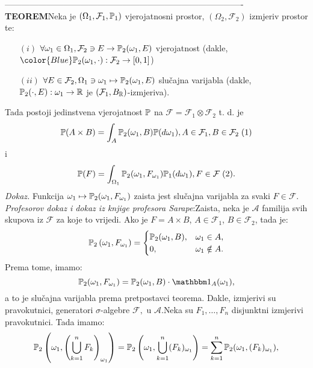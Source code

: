 \documentclass{article}
\begin{document}
-------------------------------------------------------------------------------------\newline\newline 
\textbf{TEOREM}\newline  Neka je \((\Omega_1,\mathcal F_1,\Bbb P_1)\) vjerojatnosni prostor, \((\Omega_2,\mathcal F_2)\) izmjeriv prostor te:
\begin{itemize}
    \item[\((i)\)] \(\forall\omega_1\in\Omega_1,\mathcal F_2\ni E\to\Bbb P_2(\omega_1,E)\) vjerojatnost (dakle, \(\color{Blue}\Bbb P_2(\omega_1,\cdot):\mathcal F_2\to[0,1]\))
    \item[\((ii)\)] \(\forall E\in\mathcal F_2,\Omega_1\ni\omega_1\mapsto\Bbb P_2(\omega_1,E)\) slučajna varijabla (dakle, \(\Bbb P_2(\cdot, E):\omega_1\to\Bbb R\) je \((\mathcal F_1,B_\Bbb R)\)-izmjeriva).
\end{itemize}
Tada postoji jedinstvena vjerojatnost \(\Bbb P\) na \(\mathcal F=\mathcal F_1\otimes\mathcal F_2\) t. d. je \[\Bbb P(A\times B)=\int_A\Bbb P_2(\omega_1,B)\Bbb P(d\omega_1), A\in\mathcal F_1,B\in\mathcal F_2\;(1)\] i 
\[\Bbb P(F)=\int_{\Omega_1}\Bbb P_2(\omega_1,F_{\omega_1})\Bbb P_1(d\omega_1), F\in\mathcal F\;(2).\]
\textit{Dokaz.}\newline
Funkcija \(\omega_1\mapsto\Bbb P_2(\omega_1,F_{\omega_1})\) zaista jest slučajna varijabla za svaki \(F\in\mathcal F.\)\newline\newline
\textit{Profesorov dokaz i dokaz iz knjige profesora Sarape}:\newline\newline Zaista, neka je \(\mathcal A\) familija svih skupova iz \(\mathcal F\) za koje to vrijedi. Ako je \(F = A \times B\), \(A \in \mathcal F _1\), \(B \in \mathcal F_2\), tada je:
\[\Bbb P_2\left(\omega_1, F_{\omega_1}\right)=\begin{cases} 
\Bbb P_2(\omega_1,B), &\omega_1\in A,\\0,&\omega_1\notin A.
\end{cases}\] Prema tome, imamo:\[\Bbb P_2(\omega_1, F_{\omega_1}) =\Bbb P_2(\omega_1,B)\cdot\mathbbm 1_A(\omega_1),\]
a to je slučajna varijabla prema pretpostavci teorema. Dakle, izmjerivi su pravokutnici, generatori \(\sigma\)-algebre \(\mathcal F,\) u \(\mathcal A.\)\newline Neka su \(F_1,\ldots, F_n\) disjunktni izmjerivi pravokutnici. Tada imamo:\[\Bbb P_2\left(\omega_1,\left(\bigcup_{k=1}^n F_k\right)_{\omega_1}\right)=\Bbb P_2\left(\omega_1, \bigcup_{k=1}^n(F_k)_{\omega_1}\right)=\sum_{k=1}^n\Bbb P_2(\omega_1,(F_k)_{\omega_1}),\]
\end{document}
